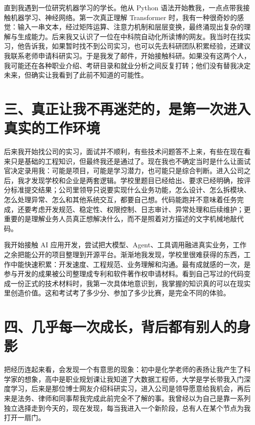 \documentclass[UTF8,zihao=5,openany]{ctexbook}
\begin{document}
直到我遇到一位研究机器学习的学长。他从 Python 语法开始教我，一点点带我接触机器学习、神经网络。第一次真正理解 Transformer 时，我有一种很奇妙的感觉：输入一串文本，经过矩阵运算、注意力机制和层层变换，最终涌现出复杂的理解与生成能力。后来我又认识了一位在中科院自动化所读博的网友。我当时在找实习，他告诉我，如果暂时找不到公司实习，也可以先去科研团队积累经验，还建议我联系老师申请科研实习。于是我发了邮件，开始接触科研。如果没有这两个人，我可能还在各种职业介绍、考研目录和就业分析之间反复打转；他们没有替我决定未来，但确实让我看到了此前不知道的可能性。

\section*{三、真正让我不再迷茫的，是第一次进入真实的工作环境}

后来我开始找公司的实习，面试并不顺利，有些技术问题答不上来，有些在现在看来只是基础的工程知识，但最终我还是通过了。现在我也不确定当时是什么让面试官决定录用我：可能是项目，可能是学习潜力，也可能只是综合判断。进入公司之后，我才发现学校和企业是两套逻辑。学校里题目已经给出、要求已经明确，按评分标准提交结果；公司里领导只说要实现什么业务功能，怎么设计、怎么拆模块、怎么处理异常、怎么和其他系统交互，都要自己想。代码能跑并不意味着任务完成，还要考虑开发规范、稳定性、权限控制、日志审计、异常处理和后续维护；更重要的是理解业务人员真正想解决什么，而不是照着对方描述的文字机械地敲代码。

我开始接触 AI 应用开发，尝试把大模型、Agent、工具调用融进真实业务，工作之余把能公开的项目整理到开源平台。渐渐地我发现，学校里很难获得的东西，工作中能快速积累：开发速度、工程规范、业务理解和沟通。最有成就感的一次，是参与开发的成果被公司整理成专利和软件著作权申请材料。看到自己写过的代码变成一份正式的技术材料时，我第一次具体地意识到，我掌握的知识真的可以在现实里创造价值。这和考试考了多少分、参加了多少比赛，是完全不同的体验。

\section*{四、几乎每一次成长，背后都有别人的身影}

把经历连起来看，会发现一个有意思的现象：初中是化学老师的表扬让我产生了科学家的想象，高中是职业规划课让我知道了大数据工程师，大学是学长带我入门深度学习，后来是那位博士网友介绍科研实习，进入公司是领导愿意给我机会，再后来是法务、律师和同事帮我完成此前完全不了解的事。我曾经以为自己是靠一系列独立选择走到今天的，现在发现，每当我进入一个新阶段，总有人在某个节点为我打开一扇门。
\end{document}
